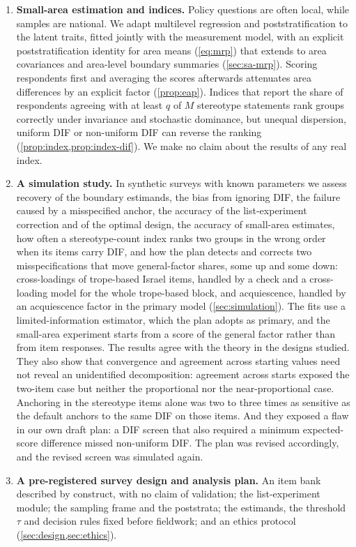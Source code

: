 \begin{enumerate}[label=\textbf{C\arabic*},ref=C\arabic*,leftmargin=2.4em,itemsep=3pt]
  \item\label{contrib:mrp} \textbf{Small-area estimation and indices.}
  Policy questions are often local, while samples are national. We adapt
  multilevel regression and poststratification \citep{gelman1997,park2004}
  to the latent traits, fitted jointly with the measurement model, with an
  explicit poststratification identity for area means (\cref{eq:mrp}) that
  extends to area covariances and area-level boundary summaries
  (\cref{sec:sa-mrp}). Scoring respondents first and averaging the scores
  afterwards attenuates area differences by an explicit factor
  (\cref{prop:eap}). Indices that report the share of respondents agreeing
  with at least $q$ of $M$ stereotype statements rank groups correctly
  under invariance and stochastic dominance, but unequal dispersion,
  uniform DIF or non-uniform DIF can reverse the ranking
  (\cref{prop:index,prop:index-dif}). We make no claim about the results of
  any real index.
  \item\label{contrib:sim} \textbf{A simulation study.} In synthetic surveys
  with known parameters we assess recovery of the boundary estimands, the
  bias from ignoring DIF, the failure caused by a misspecified anchor, the
  accuracy of the list-experiment correction and of the optimal design, the
  accuracy of small-area estimates, how often a stereotype-count index ranks
  two groups in the wrong order when its items carry DIF, and how the plan
  detects and corrects two misspecifications that move general-factor
  shares, some up and some down: cross-loadings of trope-based Israel items,
  handled by a check and a cross-loading model for the whole trope-based
  block, and acquiescence, handled by an acquiescence factor in the primary
  model (\cref{sec:simulation}). The fits use a limited-information estimator,
  which the plan adopts as primary, and the small-area experiment starts
  from a score of the general factor rather than from item responses. The
  results agree with the theory in the designs studied. They also show that
  convergence and agreement across starting values need not reveal an
  unidentified decomposition: agreement across starts exposed the two-item
  case but neither the proportional nor the near-proportional case. Anchoring
  in the stereotype items alone was two to three times as sensitive as the
  default anchors to the same DIF on those items. And they
  exposed a flaw in our own draft plan: a DIF screen that also required a
  minimum expected-score difference missed non-uniform DIF. The plan was
  revised accordingly, and the revised screen was simulated again.
  \item\label{contrib:design} \textbf{A pre-registered survey design and
  analysis plan.} An item bank described by construct, with no claim of
  validation; the list-experiment module; the sampling frame and the
  poststrata; the estimands, the threshold $\tau$ and decision rules fixed
  before fieldwork; and an ethics protocol (\cref{sec:design,sec:ethics}).
\end{enumerate}

